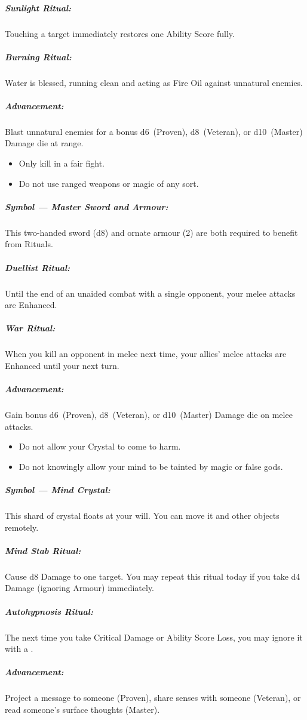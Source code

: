 \documentclass[itdr]{subfiles}
\begin{document}
\subparagraph{Sunlight Ritual:} Touching a target immediately restores one Ability Score fully.

\subparagraph{Burning Ritual:} Water is blessed, running clean and acting as Fire Oil against unnatural enemies.

\subparagraph{Advancement:} Blast unnatural enemies for a bonus d6~(Proven), d8~(Veteran), or d10~(Master) Damage die at range.

\vfill
\break
{}

{\em\begin{itemize}
		\item Only kill in a fair fight.
		\item Do not use ranged weapons or magic of any sort.
\end{itemize}}

\subparagraph{Symbol --- Master Sword and Armour:} This two-handed sword (d8) and ornate armour (2) are both required to benefit from Rituals.

\subparagraph{Duellist Ritual:} Until the end of an unaided combat with a single opponent, your melee attacks are Enhanced.

\subparagraph{War Ritual:} When you kill an opponent in melee next time, your allies' melee attacks are Enhanced until your next turn.

\subparagraph{Advancement:} Gain bonus d6~(Proven), d8~(Veteran), or d10~(Master) Damage die on melee attacks.

\vspace{2ex}

{\em\begin{itemize}
		\item Do not allow your Crystal to come to harm.
		\item Do not knowingly allow your mind to be tainted by magic or false gods.
\end{itemize}}

\subparagraph{Symbol --- Mind Crystal:} This shard of crystal floats at your will. You can move it and other objects remotely.

\subparagraph{Mind Stab Ritual:} Cause d8 Damage to one target. You may repeat this ritual today if you take d4 Damage (ignoring Armour) immediately.

\subparagraph{Autohypnosis Ritual:} The next time you take Critical Damage or Ability Score Loss, you may ignore it with a .

\subparagraph{Advancement:} Project a message to someone (Proven), share senses with someone (Veteran), or read someone's surface thoughts (Master).
\end{document}
